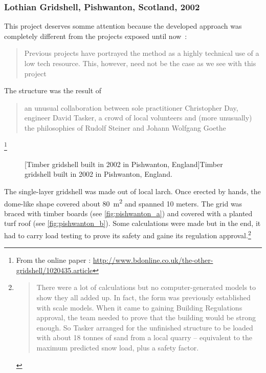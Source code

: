 \subsubsection{Lothian Gridshell, Pishwanton, Scotland, 2002}
This project deserves somme attention because the developed approach was completely different from the projects exposed until now~: \blockcquote[]{Lowenstein2002}{Previous projects have portrayed the method as a highly technical use of a low tech resource. This, however, need not be the case as we see with this project \belp{}}. The structure was the result of \blockcquote[]{bdonline2002}{\belp{} an unusual collaboration between sole practitioner Christopher Day, engineer David Tasker, a crowd of local volunteers and (more unusually) the philosophies of Rudolf Steiner and Johann Wolfgang Goethe}.\footnote{From the online paper  : \url{http://www.bdonline.co.uk/the-other-gridshell/1020435.article}}
 \begin{figure}[h]
		\hspace*{\fill}
		\vspace{10pt}
		[Timber gridshell built in 2002 in Pishwanton, England]{Timber gridshell built in 2002 in Pishwanton, England.}
		\label{fig:pishwanton} 
\end{figure}
The single-layer gridshell was made out of local larch. Once erected by hands, the dome-like shape covered about \SI{80}{m^2} and spanned 10 meters. The grid was braced with timber boards (see \cref{fig:pishwanton_a}) and covered with a planted turf roof (see \cref{fig:pishwanton_b}). Some calculations were made but in the end, it had to carry load testing to prove its safety and gaine its regulation approval.\footnote{\blockcquote[]{bdonline2002}{There were a lot of calculations but no computer-generated models to show they all added up. In fact, the form was previously established with scale models. When it came to gaining Building Regulations approval, the team needed to prove that the building would be strong enough. So Tasker arranged for the unfinished structure to be loaded with about 18 tonnes of sand from a local quarry – equivalent to the maximum predicted snow load, plus a safety factor.}}

